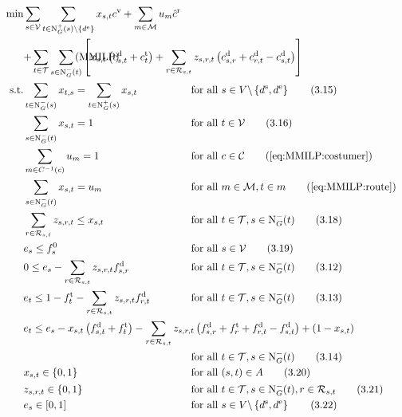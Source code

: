 \begin{align}
	\min & \sum_{s\in\mathcal{V}} \sum_{t\in\Nout(s)\backslash\{d^{\operatorname{e}}\}} x_{s,t}\cv + \sum_{m\in\mathcal{M}} u_m\hat{c}^{\operatorname{r}} \nonumber \\
	& \omit\rlap{$\displaystyle{ + \sum_{t\in\mathcal{T}} \sum_{s\in\Nin(t)} \left[x_{s,t}\left(\cd_{s,t}+\ct_{t}\right) + \sum_{r\in\Rst} z_{s,r,t}\left(\cd_{s,r}+\cd_{r,t}-\cd_{s,t}\right)\right]}$} \tag{MMILP} \label{eq:MMILP} \\
	\text{s.t.} & \sum_{t\in\Nin(s)} x_{t,s} = \sum_{t\in\Nout(s)} x_{s,t} & & \text{for all } s\in V\backslash\left\{d^{\operatorname{s}},d^{\operatorname{e}}\right\} \tag{3.15} \\
	& \sum_{s\in\Nin(t)} x_{s,t} = 1 & & \text{for all } t\in\mathcal{V} \tag{3.16} \\
	& \sum_{m\in C^{-1}(c)} u_m = 1 && \text{for all } c\in\mathcal{C} \tag{\ref{eq:MMILP:costumer}} \\
	& \sum_{s\in\Nin(t)} x_{s,t} = u_m && \text{for all } m\in\mathcal{M}, t\in m \tag{\ref{eq:MMILP:route}} \\
	& \sum_{r\in\Rst} z_{s,r,t} \leq x_{s,t} & & \text{for all } t\in\mathcal{T}, s\in\Nin(t) \tag{3.18} \\
	& e_s \leq f_s^0 & & \text{for all } s\in\mathcal{V} \tag{3.19} \\
	& 0 \leq e_s - \sum_{r\in\Rst} z_{s,r,t}\fd_{s,r} & & \text{for all } t\in\mathcal{T}, s\in\Nin(t) \tag{3.12} \\
	& e_t \leq 1 - \ft_t - \sum_{r\in\Rst} z_{s,r,t}\fd_{r,t} & & \text{for all } t\in\mathcal{T}, s\in\Nin(t) \tag{3.13} \\
	& \omit\rlap{$\displaystyle{e_t \leq e_s - x_{s,t}\left(f_{s,t}^{\operatorname{d}}+f_t^{\operatorname{t}}\right) - \sum_{r\in\Rst} z_{s,r,t}\left(\fd_{s,r}+\ft_r+\fd_{r,t}-\fd_{s,t}\right) + \left(1-x_{s,t}\right)}$} \nonumber \\
	& & & \text{for all } t\in\mathcal{T}, s\in\Nin(t) \tag{3.14} \\
	& x_{s,t}\in\{0,1\} & & \text{for all } (s,t)\in A \tag{3.20} \\
	& z_{s,r,t}\in\{0,1\} & & \text{for all } t\in\mathcal{T},s\in\Nin(t),r\in\Rst \tag{3.21} \\
	& e_s\in[0,1] & & \text{for all } s\in V\backslash\left\{d^{\operatorname{s}},d^{\operatorname{e}}\right\} \tag{3.22}
\end{align}